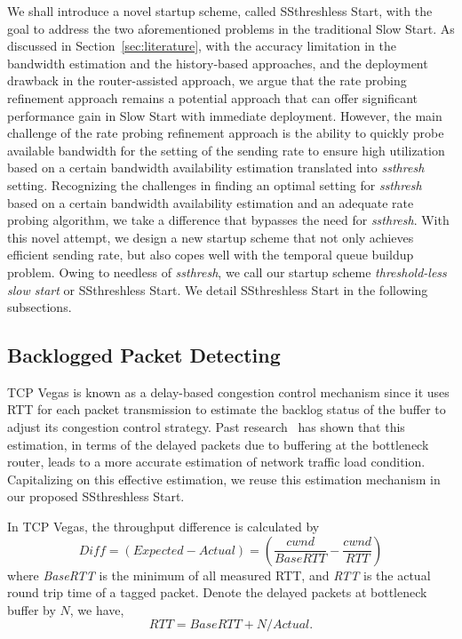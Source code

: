 \documentclass[12pt,onecolumn]{IEEEtran}
\begin{document}
We shall introduce a novel startup scheme, called SSthreshless Start, with the
goal to address the two aforementioned problems in the traditional Slow Start.
As discussed in Section~\ref{sec:literature}, with the accuracy limitation in
the bandwidth estimation and the history-based approaches, and the deployment
drawback in the router-assisted approach, we argue that the rate probing
refinement approach remains a potential approach that can offer significant
performance gain in Slow Start with immediate deployment. However, the main
challenge of the rate probing refinement approach is the ability to quickly
probe available bandwidth for the setting of the sending rate to ensure high
utilization based on a certain bandwidth availability estimation translated
into \emph{ssthresh} setting. Recognizing the challenges in finding an optimal
setting for \emph{ssthresh} based on a certain bandwidth availability
estimation and an adequate rate probing algorithm, we take a difference that
bypasses the need for \emph{ssthresh}. With this novel attempt, we design a new
startup scheme that not only achieves efficient sending rate, but also copes
well with the temporal queue buildup problem. Owing to needless of \emph{ssthresh}, we
call our startup scheme \emph{threshold-less slow start} or SSthreshless Start.
We detail SSthreshless Start in the following subsections.


\subsection{Backlogged Packet Detecting}

TCP Vegas is known as a delay-based congestion control mechanism since it uses
RTT for each packet transmission to estimate the backlog status of the buffer
to adjust its congestion control strategy. Past research~\cite{vegas1,vegas}
has shown that this estimation, in terms of the delayed packets due to
buffering at the bottleneck router, leads to a more accurate estimation of
network traffic load condition. Capitalizing on this effective estimation, we
reuse this estimation mechanism in our proposed SSthreshless Start.

In TCP Vegas, the throughput difference is calculated by
\begin{displaymath}
Diff=(Expected-Actual)=\left(\frac{cwnd}{BaseRTT}-\frac{cwnd}{RTT}\right)
\end{displaymath}
where \emph{BaseRTT} is the minimum of all measured RTT, and \emph{RTT} is the
actual round trip time of a tagged packet. Denote the delayed packets at
bottleneck buffer by $N$, we have,
\begin{displaymath}
RTT=BaseRTT+N/Actual.
\end{displaymath}
\end{document}
